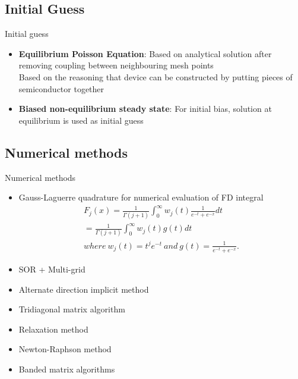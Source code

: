 \documentclass{beamer}
\begin{document}
\subsection{Initial Guess}
\begin{frame}{Initial guess}
\begin{itemize}
	\item \textbf{Equilibrium Poisson Equation}: Based on analytical solution after removing coupling between neighbouring mesh points \\
		Based on the reasoning that device can be constructed by putting pieces of semiconductor together
	\item \textbf{Biased non-equilibrium steady state}: For initial bias, solution at equilibrium is used as initial guess 
\end{itemize}  
\end{frame}

\subsection{Numerical methods}

\begin{frame}{Numerical methods}
\begin{itemize}
  \item Gauss-Laguerre quadrature for numerical evaluation of FD integral
  	\begin{align*}
	F_j(x) =  \frac{1}{\Gamma(j+1)} \int^\infty_0 w_j(t)\frac{1}{e^{-t}+e^{-x}} dt \\= \frac{1}{\Gamma(j+1)} \int^\infty_0 w_j(t)g(t) dt \\
	where\ w_j(t) = t^j e^{-t}\ and\  g(t) = \frac{1}{e^{-t}+e^{-x}}.
	\end{align*}
  
  \item SOR + Multi-grid
  \item Alternate direction implicit method
  \item Tridiagonal matrix algorithm
  \item Relaxation method
  \item Newton-Raphson method
  \item Banded matrix algorithms
\end{itemize}
\end{frame}
\end{document}
